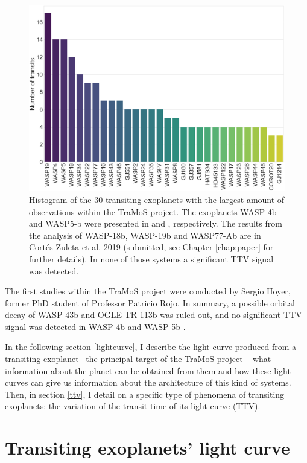 \begin{figure}[ht]
\centering
\includegraphics[width=0.9\columnwidth]{imagenes/tramos.png}
\caption{Histogram of the 30 transiting exoplanets with the largest amount of observations within the TraMoS project. The exoplanets WASP-4b and WASP5-b were presented in \cite{Hoyer2012} and \cite{Hoyer2013}, respectively. The results from the analysis of WASP-18b, WASP-19b and WASP77-Ab are in Cortés-Zuleta et al. 2019 (submitted, see Chapter \ref{chap:paper} for further details). In none of those systems a significant TTV signal was detected.}
\label{tramos}
\end{figure}


The first studies within the TraMoS project were conducted by Sergio Hoyer, former PhD student of Professor Patricio Rojo. In summary, a possible orbital decay of WASP-43b \citep{Hoyer2016b} and OGLE-TR-113b \citep{Hoyer2016} was ruled out, and no significant TTV signal was detected in WASP-4b \citep{Hoyer2012} and WASP-5b \citep{Hoyer2013}.

In the following section \ref{lightcurve}, I describe the light curve produced from a transiting exoplanet --the principal target of the TraMoS project --  what information about the planet can be obtained from them and how these light curves can give us information about the architecture of this kind of systems. Then, in section \ref{ttv}, I detail on a specific type of phenomena of transiting exoplanets: the variation of the transit time of its light curve (TTV).

\section{Transiting exoplanets' light curve\label{lightcurve}}

